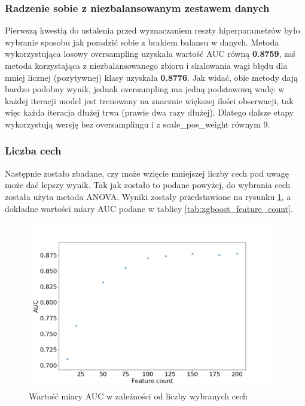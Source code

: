 \documentclass[12pt]{article}
\begin{document}
\subsubsection{Radzenie sobie z niezbalansowanym zestawem danych}

Pierwszą kwestią do ustalenia przed wyznaczaniem reszty hiperparametrów było wybranie sposobu jak poradzić sobie z brakiem balansu w danych. Metoda wykorzystująca losowy oversampling uzyskała wartość AUC równą \textbf{0.8759}, zaś metoda korzystająca z niezbalansowanego zbioru i skalowania wagi błędu dla mniej licznej (pozytywnej) klasy uzyskała \textbf{0.8776}. Jak widać, obie metody dają bardzo podobny wynik, jednak oversampling ma jedną podstawową wadę: w każdej iteracji model jest trenowany na znacznie większej ilości obserwacji, tak więc każda iteracja dłużej trwa (prawie dwa razy dłużej). Dlatego dalsze etapy wykorzystują wersję bez oversamplingu i z scale\_pos\_weight równym 9.

\subsubsection{Liczba cech}

Następnie zostało zbadane, czy może wzięcie mniejszej liczby cech pod uwagę może dać lepszy wynik. Tak jak zostało to podane powyżej, do wybrania cech została użyta metoda ANOVA. Wyniki zostały przedstawione na rysunku \ref{fig:xgboost_feature_count}, a dokładne wartości miary AUC podane w tablicy \ref{tab:xgboost_feature_count}.

\begin{figure}[h]
    \centering
    \includegraphics[width=0.95\textwidth]{xgboost/feature_count.png}
    \caption{Wartość miary AUC w zależności od liczby wybranych cech}
    \label{fig:xgboost_feature_count}
\end{figure}
\end{document}
